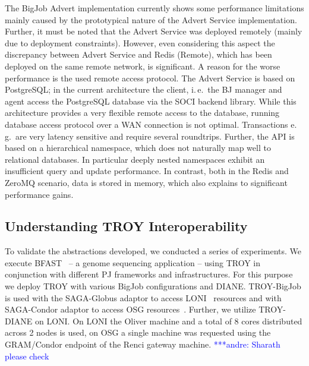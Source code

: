 \documentclass[conference,final]{IEEEtran}
\newcommand{\jhanote}[1]{ {\textcolor{red} { ***shantenu: #1 }}}
\newcommand{\alnote}[1]{ {\textcolor{blue} { ***andre: #1 }}}
\newcommand{\alnote}[1]{}
\newcommand{\jhanote}[1]{}
\begin{document}
The BigJob Advert implementation currently shows some performance
limitations mainly caused by the prototypical nature of the Advert
Service implementation.  Further, it must be noted that the Advert
Service was deployed remotely (mainly due to deployment
constraints). However, even considering this aspect the discrepancy
between Advert Service and Redis (Remote), which has been deployed on
the same remote network, is significant. A reason for the worse
performance is the used remote access protocol. The Advert Service is
based on PostgreSQL; in the current architecture the client, i.\,e.\
the BJ manager and agent access the PostgreSQL database via the SOCI
backend library. While this architecture provides a very flexible
remote access to the database, running database access protocol over a
WAN connection is not optimal. %
Transactions e.\,g.\ are very latency
sensitive and require several roundtrips.  Further, the API is based
on a hierarchical namespace, which does not naturally map well to
relational databases. In particular deeply nested namespaces exhibit
an insufficient query and update performance. In contrast, both in the
Redis and ZeroMQ scenario, data is stored in memory, which also
explains to significant performance gains.


\subsection{Understanding TROY Interoperability}

To validate the abstractions developed, we conducted a series of experiments. We
execute BFAST~\cite{bfast2009} -- a genome sequencing application -- using TROY
in conjunction with different PJ frameworks and infrastructures. For this
purpose we deploy TROY with various BigJob configurations and DIANE. TROY-BigJob
is used with the SAGA-Globus adaptor to access LONI~\cite{loni} resources and 
with SAGA-Condor adaptor to access OSG resources~\cite{1742-6596-78-1-012057}. 
Further, we utilize TROY-DIANE on LONI. On LONI the Oliver machine and a total 
of 8 cores distributed across 2 nodes is used, on OSG a single machine was 
requested using the GRAM/Condor endpoint of the Renci gateway machine. 
\alnote{Sharath please check}
\end{document}
